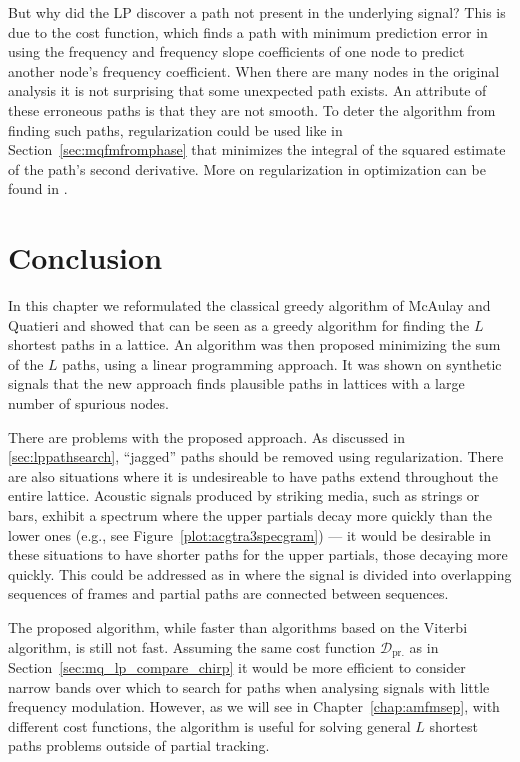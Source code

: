 But why did the LP discover a path not present in the underlying signal? This is
due to the cost function, which finds a path with minimum prediction error in
using the frequency and frequency slope coefficients of one node to predict
another node's frequency coefficient. When there are many nodes in the original
analysis it is not surprising that some unexpected path exists.  An attribute of
these erroneous paths is that they are not smooth. To deter the algorithm from
finding such paths, regularization could be used like in
Section~\ref{sec:mqfmfromphase} that minimizes the integral of the squared
estimate of the path's second derivative. More on regularization in optimization
can be found in \cite[ch.~6.3]{boyd2004convex}.

\section{Conclusion}

In this chapter we reformulated the classical greedy algorithm of McAulay and
Quatieri and showed that can be seen as a greedy algorithm for finding the $L$
shortest paths in a lattice. An algorithm was then proposed minimizing the sum
of the $L$ paths, using a linear programming approach. It was shown on synthetic
signals that the new approach finds plausible paths in lattices with a
large number of spurious nodes.

There are problems with the proposed approach. As discussed in
\ref{sec:lppathsearch}, ``jagged'' paths should be removed using regularization.
There are also situations where it is undesireable to have paths extend
throughout the entire lattice. Acoustic signals produced by striking media, such
as strings or bars, exhibit a spectrum where the upper partials decay more
quickly than the lower ones (e.g., see Figure~\ref{plot:acgtra3specgram}) --- it
would be desirable in these situations to have shorter paths for the upper
partials, those decaying more quickly. This could be addressed as in
\cite{depalle1993tracking} where the signal is divided into overlapping sequences of
frames and partial paths are connected between sequences.

The proposed algorithm, while faster than algorithms based on the Viterbi
algorithm, is still not fast. Assuming the same cost function
$\mathcal{D}_{\text{pr.}}$ as in Section~\ref{sec:mq_lp_compare_chirp} it would
be more efficient to consider narrow bands over which to search for paths when
analysing signals with little frequency modulation. However, as we will see in
Chapter~\ref{chap:amfmsep}, with different cost functions, the algorithm is
useful for solving general $L$ shortest paths problems outside of partial
tracking. 



